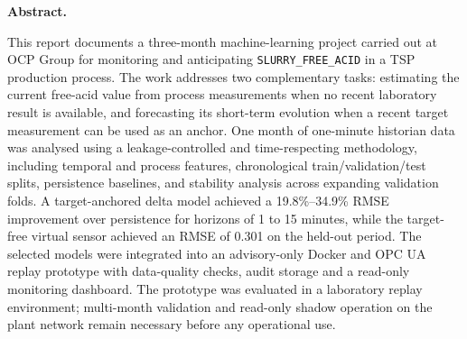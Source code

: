 \clearpage

\thispagestyle{empty}

\vspace*{3cm}

\begin{center}

\vspace{1.5cm}

\begin{minipage}{0.80\textwidth}

\centering

\textbf{Abstract.}

This report documents a three-month machine-learning project carried out at OCP Group for monitoring and anticipating \texttt{SLURRY\_FREE\_ACID} in a TSP production process. The work addresses two complementary tasks: estimating the current free-acid value from process measurements when no recent laboratory result is available, and forecasting its short-term evolution when a recent target measurement can be used as an anchor. One month of one-minute historian data was analysed using a leakage-controlled and time-respecting methodology, including temporal and process features, chronological train/validation/test splits, persistence baselines, and stability analysis across expanding validation folds. A target-anchored delta model achieved a 19.8\%--34.9\% RMSE improvement over persistence for horizons of 1 to 15 minutes, while the target-free virtual sensor achieved an RMSE of 0.301 on the held-out period. The selected models were integrated into an advisory-only Docker and OPC UA replay prototype with data-quality checks, audit storage and a read-only monitoring dashboard. The prototype was evaluated in a laboratory replay environment; multi-month validation and read-only shadow operation on the plant network remain necessary before any operational use.

\end{minipage}

\vfill

\vspace*{2cm}

\end{center}